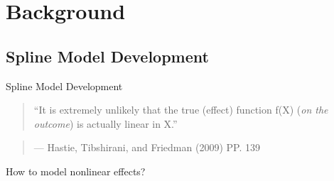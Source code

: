 \documentclass[
  ignorenonframetext,
  aspectratio=169]{beamer}
\begin{document}
\hypertarget{background}{%
\section{Background}\label{background}}

\hypertarget{spline-model-development}{%
\subsection{Spline Model Development}\label{spline-model-development}}

\begin{frame}{Spline Model Development}
\begin{quote}
``It is extremely unlikely that the true (effect) function f(X)
(\emph{on the outcome}) is actually linear in X.'' \hspace*{2cm}
\end{quote}

\begin{quote}
--- Hastie, Tibshirani, and Friedman (2009) PP. 139
\end{quote}

\begin{tcolorbox}[colback=green!5,colframe=green!40!black,title=Question]
How to model nonlinear effects?
\end{tcolorbox}
\end{frame}
\end{document}
